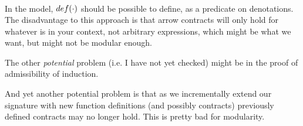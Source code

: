 \documentclass[preprint,nocopyrightspace]{sigplanconf}
\begin{document}
\[\begin{array}{lll}
\end{array}\]


In the model, ${\mathop{def}}(\cdot)$ should be possible to define, as a
predicate on denotations. The disadvantage to this approach is that
arrow contracts will only hold for whatever is in your context, not
arbitrary expressions, which might be what we want, but might not be
modular enough.

The other {\em potential} problem (i.e. I have not yet checked) might be in the 
proof of admissibility of induction. 

And yet another potential problem is that as we incrementally extend our signature 
with new function definitions (and possibly contracts) previously defined contracts
may no longer hold. This is pretty bad for modularity.
\end{document}
